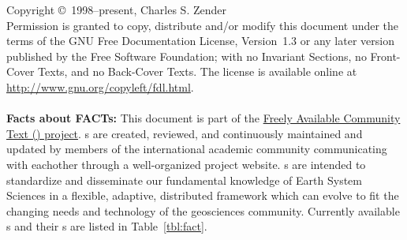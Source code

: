 \documentclass[12pt]{article}
\begin{document}
\bigskip\noindent
Copyright \copyright\ 1998--present, Charles S. Zender\\
Permission is granted to copy, distribute and/or modify this document
under the terms of the GNU Free Documentation License, Version~1.3
or any later version published by the Free Software Foundation;
with no Invariant Sections, no Front-Cover Texts, and no Back-Cover
Texts.
The license is available online at
\url{http://www.gnu.org/copyleft/fdl.html}.
\\
\\
\textbf{Facts about FACTs:}
This document is part of the 
\href{http://dust.ess.uci.edu/facts}{Freely Available Community Text () project}.  
s are created, reviewed, and continuously maintained and updated
by members of the international academic community communicating with
eachother through a well-organized project website. 
s are intended to standardize and disseminate our fundamental
knowledge of Earth System Sciences in a flexible, adaptive,
distributed framework which can evolve to fit the changing needs and
technology of the geosciences community. 
Currently available s and their s are listed in
Table~\ref{tbl:fact}. 
\end{document}
